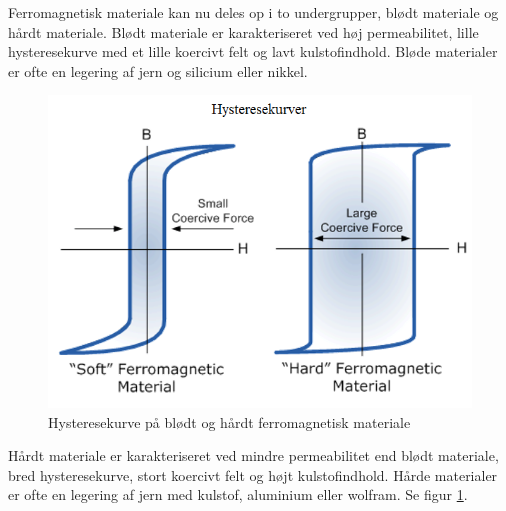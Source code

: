 Ferromagnetisk materiale kan nu deles op i to undergrupper, blødt materiale og hårdt materiale. Blødt materiale er karakteriseret ved høj permeabilitet, lille hysteresekurve med et lille koercivt felt og lavt kulstofindhold. Bløde materialer er ofte en legering af jern og silicium eller nikkel. \\
\begin{figure}
\includegraphics[scale=0.4]{./Graphics/Hysteresekurver}
\caption{Hysteresekurve på blødt og hårdt ferromagnetisk materiale}
\label{Hysteresekurve}
\vspace{-110pt}
\end{figure}
Hårdt materiale er karakteriseret ved mindre permeabilitet end blødt materiale, bred hysteresekurve, stort koercivt felt og højt kulstofindhold. Hårde materialer er ofte en legering af jern med kulstof, aluminium eller wolfram. Se figur \ref{Hysteresekurve}. 

\newpage
